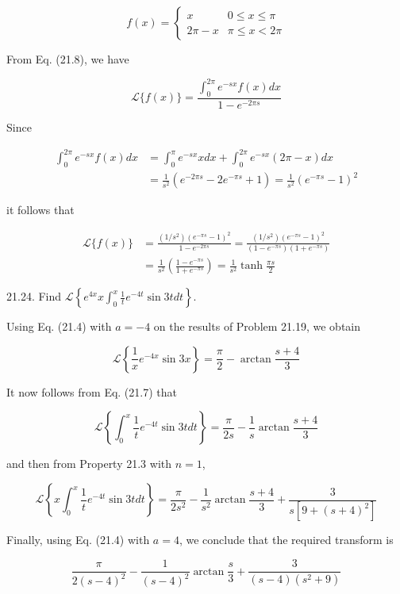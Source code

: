 \documentclass[10pt]{article}
\begin{document}
$$
f(x)=\left\{\begin{array}{cc}
x & 0 \leq x \leq \pi \\
2 \pi-x & \pi \leq x<2 \pi
\end{array}\right.
$$

From Eq. (21.8), we have

$$
\mathscr{L}\{f(x)\}=\frac{\int_{0}^{2 \pi} e^{-s x} f(x) d x}{1-e^{-2 \pi s}}
$$

Since

$$
\begin{aligned}
\int_{0}^{2 \pi} e^{-s x} f(x) d x & =\int_{0}^{\pi} e^{-s x} x d x+\int_{0}^{2 \pi} e^{-s x}(2 \pi-x) d x \\
& =\frac{1}{s^{2}}\left(e^{-2 \pi s}-2 e^{-\pi s}+1\right)=\frac{1}{s^{2}}\left(e^{-\pi s}-1\right)^{2}
\end{aligned}
$$

it follows that

$$
\begin{aligned}
\mathscr{L}\{f(x)\} & =\frac{\left(1 / s^{2}\right)\left(e^{-\pi s}-1\right)^{2}}{1-e^{-2 \pi s}}=\frac{\left(1 / s^{2}\right)\left(e^{-\pi s}-1\right)^{2}}{\left(1-e^{-\pi s}\right)\left(1+e^{-\pi s}\right)} \\
& =\frac{1}{s^{2}}\left(\frac{1-e^{-\pi s}}{1+e^{-\pi s}}\right)=\frac{1}{s^{2}} \tanh \frac{\pi s}{2}
\end{aligned}
$$

21.24. Find $\mathscr{L}\left\{e^{4 x} x \int_{0}^{x} \frac{1}{t} e^{-4 t} \sin 3 t d t\right\}$.

Using Eq. (21.4) with $a=-4$ on the results of Problem 21.19, we obtain

$$
\mathscr{L}\left\{\frac{1}{x} e^{-4 x} \sin 3 x\right\}=\frac{\pi}{2}-\arctan \frac{s+4}{3}
$$

It now follows from Eq. (21.7) that

$$
\mathscr{L}\left\{\int_{0}^{x} \frac{1}{t} e^{-4 t} \sin 3 t d t\right\}=\frac{\pi}{2 s}-\frac{1}{s} \arctan \frac{s+4}{3}
$$

and then from Property 21.3 with $n=1$,

$$
\mathscr{L}\left\{x \int_{0}^{x} \frac{1}{t} e^{-4 t} \sin 3 t d t\right\}=\frac{\pi}{2 s^{2}}-\frac{1}{s^{2}} \arctan \frac{s+4}{3}+\frac{3}{s\left[9+(s+4)^{2}\right]}
$$

Finally, using Eq. (21.4) with $a=4$, we conclude that the required transform is

$$
\frac{\pi}{2(s-4)^{2}}-\frac{1}{(s-4)^{2}} \arctan \frac{s}{3}+\frac{3}{(s-4)\left(s^{2}+9\right)}
$$
\end{document}
